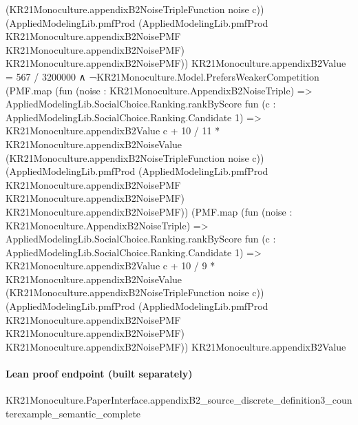\documentclass[10pt]{article}
\begin{document}
\begin{ReviewVerbatim}
                                          (KR21Monoculture.appendixB2NoiseTripleFunction noise c))
                                (AppliedModelingLib.pmfProd
                                  (AppliedModelingLib.pmfProd KR21Monoculture.appendixB2NoisePMF
                                    KR21Monoculture.appendixB2NoisePMF)
                                  KR21Monoculture.appendixB2NoisePMF))
                              KR21Monoculture.appendixB2Value =
                          567 / 3200000 ∧
                        ¬KR21Monoculture.Model.PrefersWeakerCompetition
                            (PMF.map
                              (fun (noise : KR21Monoculture.AppendixB2NoiseTriple) =>
                                AppliedModelingLib.SocialChoice.Ranking.rankByScore
                                  fun (c : AppliedModelingLib.SocialChoice.Ranking.Candidate 1) =>
                                  KR21Monoculture.appendixB2Value c +
                                    10 / 11 *
                                      KR21Monoculture.appendixB2NoiseValue
                                        (KR21Monoculture.appendixB2NoiseTripleFunction noise c))
                              (AppliedModelingLib.pmfProd
                                (AppliedModelingLib.pmfProd KR21Monoculture.appendixB2NoisePMF
                                  KR21Monoculture.appendixB2NoisePMF)
                                KR21Monoculture.appendixB2NoisePMF))
                            (PMF.map
                              (fun (noise : KR21Monoculture.AppendixB2NoiseTriple) =>
                                AppliedModelingLib.SocialChoice.Ranking.rankByScore
                                  fun (c : AppliedModelingLib.SocialChoice.Ranking.Candidate 1) =>
                                  KR21Monoculture.appendixB2Value c +
                                    10 / 9 *
                                      KR21Monoculture.appendixB2NoiseValue
                                        (KR21Monoculture.appendixB2NoiseTripleFunction noise c))
                              (AppliedModelingLib.pmfProd
                                (AppliedModelingLib.pmfProd KR21Monoculture.appendixB2NoisePMF
                                  KR21Monoculture.appendixB2NoisePMF)
                                KR21Monoculture.appendixB2NoisePMF))
                            KR21Monoculture.appendixB2Value
\end{ReviewVerbatim}

\paragraph{Lean proof endpoint (built separately)}\begin{ReviewVerbatim}
KR21Monoculture.PaperInterface.appendixB2_source_discrete_definition3_counterexample_semantic_complete
\end{ReviewVerbatim}
\end{document}
